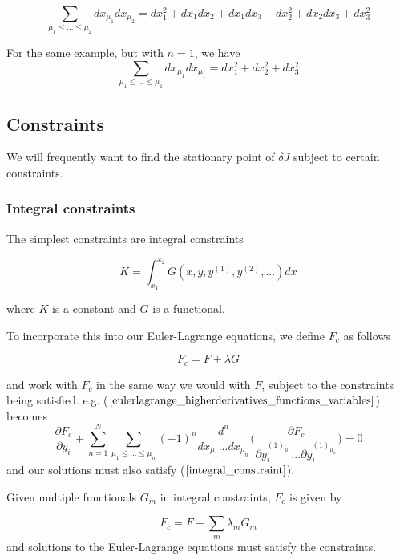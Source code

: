 \documentclass[]{article}
\begin{document}
\begin{equation*} \sum_{\mu_{1} \leq ...\leq \mu_{2}}d x_{\mu_{1}}d x_{\mu_{2}} = d x_{1}^{2} + d x_{1} d x_{2} + d x_{1} d x_{3} +d x_{2}^{2} + d x_{2}d x_{3} + d x_{3}^{2}\end{equation*}

For the same example, but with $n=1$, we have
\begin{equation*} \sum_{\mu_{1} \leq ...\leq \mu_{1}}d x_{\mu_{1}}d x_{\mu_{1}} = d x_{1}^{2} + d x_{2}^{2} + d x_{3}^{2}\end{equation*}
\subsection{Constraints}
We will frequently want to find the stationary point of $\delta J$ subject to certain constraints. 
\subsubsection{Integral constraints}
The simplest constraints are integral constraints 

\begin{equation} K = \int_{x_{1}}^{x_{2}} G(x, y, y^{(1)},y^{(2)},...) dx \label{integral_constraint}\end{equation}

where $K$ is a constant and $G$ is a functional.

To incorporate this into our Euler-Lagrange equations, we define $F_{c}$ as follows

\begin{equation*} F_{c} = F + \lambda G \end{equation*}

and work with $F_{c}$ in the same way we would with $F$, subject to the constraints being satisfied. e.g. ($\ref{eulerlagrange_higherderivatives_functions_variables}$) becomes
\begin{equation*} \frac{\partial F_{c}}{\partial y_{i}} +  \sum_{n=1}^{N} \sum_{\mu_{1} \leq ...\leq \mu_{n}} (-1)^{n}\frac{d^{n}}{d x_{\mu_{1}}...d x_{\mu_{n}}} \bigg(\frac{\partial F_{c}}{\partial y^{(1)_{\mu_{1}}}_{i} ...\partial y^{(1)_{\mu_{n}}}_{i}}\bigg) = 0 \end{equation*}  
and our solutions must also satisfy ($\ref{integral_constraint}$).

Given multiple functionals $G_{m}$ in integral constraints, $F_{c}$ is given by

\begin{equation*} F_{c} = F + \sum_{m} \lambda_{m} G_{m} \end{equation*}
and solutions to the Euler-Lagrange equations must satisfy the constraints.
\end{document}
